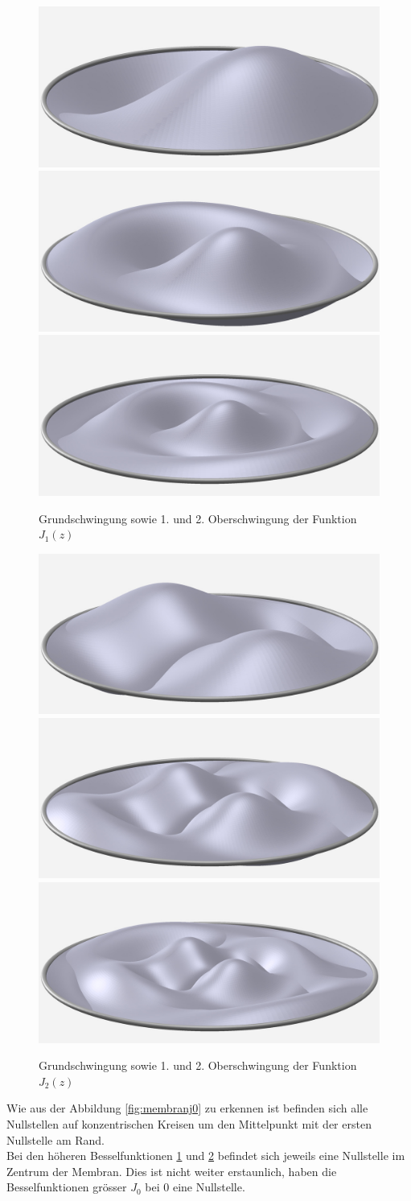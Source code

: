 \begin{figure}
        \includegraphics[width=0.33\hsize]{./kreis/membran/circle-1-1.jpg}
        \includegraphics[width=0.33\hsize]{./kreis/membran/circle-2-1.jpg}
        \includegraphics[width=0.33\hsize]{./kreis/membran/circle-3-1.jpg}
        \caption{Grundschwingung sowie 1. und 2. Oberschwingung der Funktion $J_1(z)$}
        \label{fig:membranj1}
\end{figure}
\begin{figure}
        \includegraphics[width=0.33\hsize]{./kreis/membran/circle-1-2.jpg}
        \includegraphics[width=0.33\hsize]{./kreis/membran/circle-2-2.jpg}
        \includegraphics[width=0.33\hsize]{./kreis/membran/circle-3-2.jpg}
        \caption{Grundschwingung sowie 1. und 2. Oberschwingung der Funktion $J_2(z)$}
        \label{fig:membranj2}
\end{figure}
Wie aus der Abbildung \ref{fig:membranj0} zu erkennen ist befinden sich alle Nullstellen auf konzentrischen Kreisen um den Mittelpunkt mit der ersten Nullstelle am Rand.
\\
Bei den höheren Besselfunktionen \ref{fig:membranj1} und \ref{fig:membranj2} befindet sich jeweils eine Nullstelle im Zentrum der Membran. Dies ist nicht weiter erstaunlich, haben die Besselfunktionen grösser $J_0$ bei 0 eine Nullstelle. 
